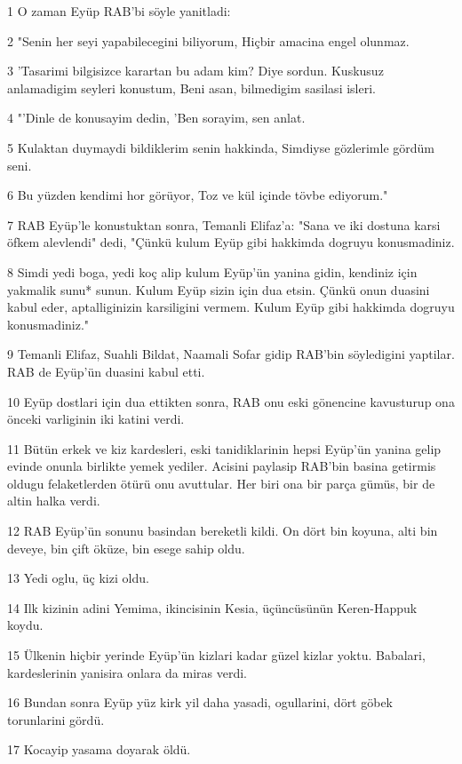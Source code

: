 \par 1 O zaman Eyüp RAB'bi söyle yanitladi:
\par 2 "Senin her seyi yapabilecegini biliyorum, Hiçbir amacina engel olunmaz.
\par 3 'Tasarimi bilgisizce karartan bu adam kim? Diye sordun. Kuskusuz anlamadigim seyleri konustum, Beni asan, bilmedigim sasilasi isleri.
\par 4 "'Dinle de konusayim dedin, 'Ben sorayim, sen anlat.
\par 5 Kulaktan duymaydi bildiklerim senin hakkinda, Simdiyse gözlerimle gördüm seni.
\par 6 Bu yüzden kendimi hor görüyor, Toz ve kül içinde tövbe ediyorum."
\par 7 RAB Eyüp'le konustuktan sonra, Temanli Elifaz'a: "Sana ve iki dostuna karsi öfkem alevlendi" dedi, "Çünkü kulum Eyüp gibi hakkimda dogruyu konusmadiniz.
\par 8 Simdi yedi boga, yedi koç alip kulum Eyüp'ün yanina gidin, kendiniz için yakmalik sunu* sunun. Kulum Eyüp sizin için dua etsin. Çünkü onun duasini kabul eder, aptalliginizin karsiligini vermem. Kulum Eyüp gibi hakkimda dogruyu konusmadiniz."
\par 9 Temanli Elifaz, Suahli Bildat, Naamali Sofar gidip RAB'bin söyledigini yaptilar. RAB de Eyüp'ün duasini kabul etti.
\par 10 Eyüp dostlari için dua ettikten sonra, RAB onu eski gönencine kavusturup ona önceki varliginin iki katini verdi.
\par 11 Bütün erkek ve kiz kardesleri, eski tanidiklarinin hepsi Eyüp'ün yanina gelip evinde onunla birlikte yemek yediler. Acisini paylasip RAB'bin basina getirmis oldugu felaketlerden ötürü onu avuttular. Her biri ona bir parça gümüs, bir de altin halka verdi.
\par 12 RAB Eyüp'ün sonunu basindan bereketli kildi. On dört bin koyuna, alti bin deveye, bin çift öküze, bin esege sahip oldu.
\par 13 Yedi oglu, üç kizi oldu.
\par 14 Ilk kizinin adini Yemima, ikincisinin Kesia, üçüncüsünün Keren-Happuk koydu.
\par 15 Ülkenin hiçbir yerinde Eyüp'ün kizlari kadar güzel kizlar yoktu. Babalari, kardeslerinin yanisira onlara da miras verdi.
\par 16 Bundan sonra Eyüp yüz kirk yil daha yasadi, ogullarini, dört göbek torunlarini gördü.
\par 17 Kocayip yasama doyarak öldü.


